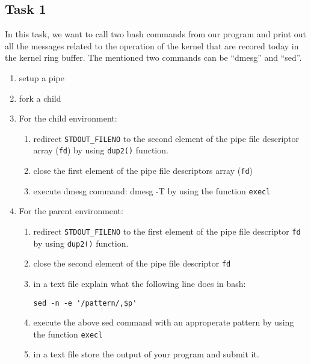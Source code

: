 \documentclass[16pt]{article}
\begin{document}
\subsection*{Task 1}
In this task, we want to call two bash commands from our program and print out
all the messages related to the operation of the kernel that are recored today in the kernel ring buffer. The mentioned two commands can be ``dmesg'' and ``sed''.
\begin{enumerate}
\item setup a pipe 
\item fork a child 
\item For the child environment:
\begin{enumerate}
\item redirect \texttt{STDOUT\_FILENO} to the second element of the pipe file descriptor array (\texttt{fd}) by using \texttt{dup2()} function.
\item close the first element of the pipe file descriptors array (\texttt{fd})
\item execute dmesg command: dmesg -T
by using the function \lstinline$execl$
\end{enumerate}
\item For the parent environment:
\begin{enumerate}
\item redirect \texttt{STDOUT\_FILENO} to the first element of the pipe file descriptor \texttt{fd} by using \texttt{dup2()} function.
\item close the second element of the pipe file descriptor \texttt{fd}
\item in a text file explain what the following line does in bash:
\begin{lstlisting}
sed -n -e '/pattern/,$p'  
\end{lstlisting}
\item execute the above sed command 
 with an approperate pattern
by using the function \lstinline$execl$
\item in a text file store the output of your program and submit it.
\end{enumerate}
\end{enumerate}
\end{document}
